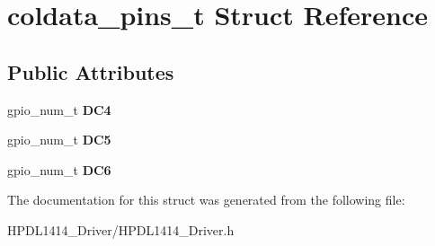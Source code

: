 \hypertarget{structcoldata__pins__t}{}\section{coldata\+\_\+pins\+\_\+t Struct Reference}
\label{structcoldata__pins__t}
\subsection*{Public Attributes}
\begin{DoxyCompactItemize}
\item 
\mbox{\label{structcoldata__pins__t_a16fc69eded5449019df4d210a915302a}} 
gpio\+\_\+num\+\_\+t {\bfseries D\+C4}
\item 
\mbox{\label{structcoldata__pins__t_a25f59ac3f9dde53fb449f526f2d33a3c}} 
gpio\+\_\+num\+\_\+t {\bfseries D\+C5}
\item 
\mbox{\label{structcoldata__pins__t_aac445fc2d86b5768bf13a531a327ad8a}} 
gpio\+\_\+num\+\_\+t {\bfseries D\+C6}
\end{DoxyCompactItemize}


The documentation for this struct was generated from the following file\+:\begin{DoxyCompactItemize}
\item 
H\+P\+D\+L1414\+\_\+\+Driver/H\+P\+D\+L1414\+\_\+\+Driver.\+h\end{DoxyCompactItemize}
